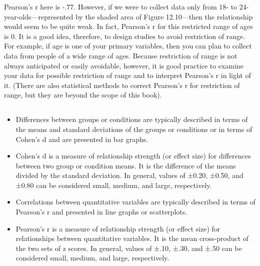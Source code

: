 Pearson's r here is -.77. However, if we were to collect data only from 18- to 24-year-olds---represented by the shaded area of Figure 12.10---then the relationship would seem to be quite weak. In fact, Pearson's r for this restricted range of ages is 0. It is a good idea, therefore, to design studies to avoid restriction of range. For example, if age is one of your primary variables, then you can plan to collect data from people of a wide range of ages. Because restriction of range is not always anticipated or easily avoidable, however, it is good practice to examine your data for possible restriction of range and to interpret Pearson's r in light of it. (There are also statistical methods to correct Pearson's r for restriction of range, but they are beyond the scope of this book).



\subsection{}
\begin{fullwidth}
\begin{itemize}
\item Differences between groups or conditions are typically described in terms of the means and standard deviations of the groups or conditions or in terms of Cohen's d and are presented in bar graphs.

\item Cohen's d is a measure of relationship strength (or effect size) for differences between two group or condition means. It is the difference of the means divided by the standard deviation. In general, values of ±0.20, ±0.50, and ±0.80 can be considered small, medium, and large, respectively.

\item Correlations between quantitative variables are typically described in terms of Pearson's r and presented in line graphs or scatterplots.

\item Pearson's r is a measure of relationship strength (or effect size) for relationships between quantitative variables. It is the mean cross-product of the two sets of z scores. In general, values of ±.10, ±.30, and ±.50 can be considered small, medium, and large, respectively.

\end{itemize}
\end{fullwidth}

 

